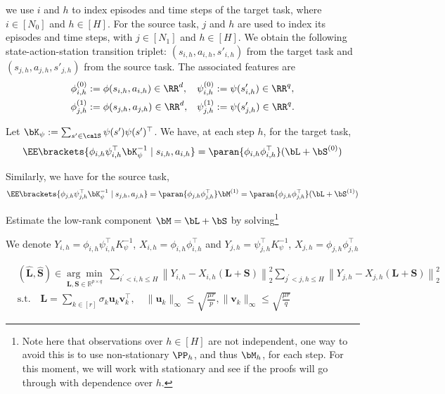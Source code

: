 we use $i$ and $h$ to index episodes and time steps of the target task, where $i \in [N_0]$ and $h \in [H]$. For the source task, $j$ and $h$ are used to index its episodes and time steps, with $j \in [N_1]$ and $h \in [H]$.
We obtain the following state-action-station transition triplet: $(s_{i, h}, a_{i, h}, s'_{i, h})$ from the target task and $(s_{j, h}, a_{j, h}, s'_{j, h})$ from the source task.
The associated features are 
\begin{equation}
\begin{aligned}
    \phi_{i, h}^{(0)} &:= \phi(s_{i, h}, a_{i, h}) \in \RR^d, & \psi_{i, h}^{(0)} &:= \psi(s'_{i, h}) \in \RR^{q}, \\
    \phi_{j, h}^{(1)} &:= \phi(s_{j, h}, a_{j, h}) \in \RR^d, & \psi_{j, h}^{(1)} &:= \psi(s'_{j, h}) \in \RR^{q}.
\end{aligned}
\end{equation}

Let $\bK_{\psi} := \sum_{s'\in\calS} \psi(s') \psi(s')^\top$. 
We have, at each step $h$, for the target task, 
   $$\EE\brackets{\phi_{i,h}\psi_{i,h}^\top \bK_{\psi}^{-1} \mid s_{i,h}, a_{i,h}} 
    = \paran{\phi_{i,h} \phi_{i,h}^\top} (\bL + \bS^{(0)})$$
    
Similarly, we have for the source task, 
$$\EE\brackets{\phi_{j,h}\psi_{j,h}^\top \bK_{\psi}^{-1} \mid s_{j,h}, a_{j,h}}= \paran{\phi_{j,h} \phi_{j,h}^\top} \bM^{(1)}= \paran{\phi_{j,h} \phi_{j,h}^\top} (\bL + \bS^{(1)})$$

 Estimate the low-rank component $\bM = \bL + \bS$ by solving\footnote{Note here that observations over $h \in [H]$ are not independent, one way to avoid this is to use non-stationary $\PP_h$, and thus $\bM_h$, for each step. 
For this moment, we will work with stationary and see if the proofs will go through with dependence over $h$.} 

We denote $Y_{i,h}=\phi_{i,h}\psi_{i, h}^{\top}K_{\psi}^{-1}$, $X_{i,h}=\phi_{i,h}\phi_{i,h}^\top$ and $Y_{j,h}=\psi_{j, h}^{\top}K_{\psi}^{-1}$, $X_{j,h}=\phi_{j,h} \phi_{j,h}^\top$

\begin{equation}
\begin{aligned}
&(\hat{\mathbf{L}}, \hat{\mathbf{S}}) \in 
    \underset{\mathbf{L}, \mathbf{S} \in \mathbb{R}^{p \times q}}{\arg\min}\;  \sum_{i^{\prime}<i, h \leq H}\left\|Y_{i,h}-X_{i,h}(\boldsymbol{L}+\boldsymbol{S})\right\|_{2}^{2}\sum_{j^{\prime}<j, h \leq H}\left\|Y_{j, h}-X_{j,h}(\boldsymbol{L}+\boldsymbol{S})\right\|_{2}^{2}   \\
&\text{s.t.}\quad \mathbf{L} = \sum_{k \in [r]} \sigma_k \mathbf{u}_k \mathbf{v}_k^\top,
\quad \|\mathbf{u}_k\|_\infty \leq \sqrt{\frac{\mu r}{p}}, \|\mathbf{v}_k\|_\infty \leq \sqrt{\frac{\mu r}{q}}
\end{aligned}
\label{eq:tl-step1}
\end{equation}

